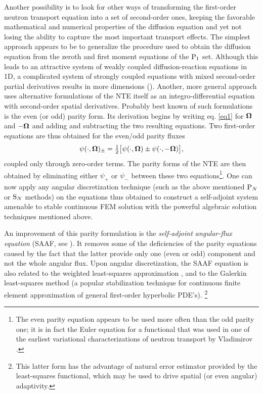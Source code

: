 {Another possibility is to look for other ways of transforming the first-order neutron transport equation into a set of
second-order ones, keeping the favorable mathematical and numerical properties of the diffusion equation and yet not
losing the ability to capture the most important transport effects. The simplest approach appears to be to generalize
the procedure used to obtain the diffusion equation from the zeroth and first moment equations of the $\PN[1]$ set.
Although this leads to an attractive system of weakly coupled diffusion-reaction equations in 1D, a complicated system
of strongly coupled equations with mixed second-order partial derivatives results in more dimensions (\cite{Capilla}).
Another, more general approach uses alternative formulations of the NTE itself as an integro-differential equation with
second-order spatial derivatives. Probably best known of such formulations is the even (or odd) parity form. Its
derivation begins by writing eq. \eqref{eq1} for $\bomega$ and $-\bomega$ and adding and subtracting the two resulting
equations. Two first-order equations are thus obtained for the even/odd parity fluxes  
$$
\psi(\cdot,\bomega)_{\pm} =
\tfrac12\bigl[\psi(\cdot,\bomega) \pm \psi(\cdot,-\bomega)\bigr],$$ 
coupled only through zero-order terms. The parity
forms of the NTE are then obtained by eliminating either $\psi_+$ or $\psi_-$ between these two equations\footnote{The
even parity equation appears to be used more often than the odd parity one; it is in fact the Euler equation for a
functional that was used in one of the earliest variational characterizations of neutron transport by Vladimirov
\cite{Vladimirov}.}.
One can now apply any angular discretization technique (such as the above mentioned $\PN$ or $\SN$ methods) on the 
equations thus obtained to construct a self-adjoint system amenable to stable continuous FEM solution with the powerful
algebraic solution techniques mentioned above.

An improvement of this parity formulation is the \textit{self-adjoint angular-flux equation} (SAAF, see \cite{Morel1}).
It removes some of the deficiencies of the parity equations caused by the fact that the latter provide only one (even or
odd) component and not the whole angular flux. Upon angular discretization, the SAAF equation is also related to the
weighted least-squares approximation \cite{Manteuffel}, and to the Galerkin least-squares method (a popular
stabilization technique for continuous finite element approximation of general first-order hyperbolic PDE's). \footnote{This latter form has the
advantage of natural error estimator provided by the least-squares functional, which may be used to drive spatial (or even angular)
adaptivity.}
}

